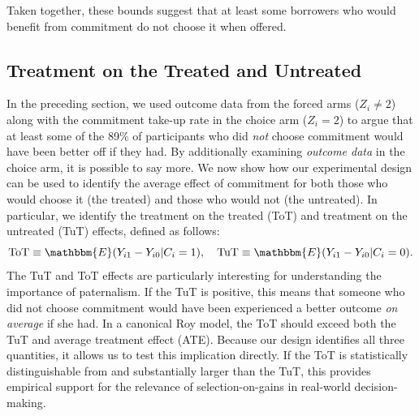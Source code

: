 \documentclass[oneside,11pt]{article}
\begin{document}

Taken together, these bounds suggest that at least some borrowers who would benefit from commitment do not choose it when offered. 

\subsection{Treatment on the Treated and Untreated}
In the preceding section, we used outcome data from the forced arms ($Z_i\neq 2$) along with the commitment take-up rate in the choice arm ($Z_i = 2$) to argue that at least some of the 89\% of participants who did \emph{not} choose commitment would have been better off if they had. By additionally examining \emph{outcome data} in the choice arm, it is possible to say more. We now show how our experimental design can be used to identify the average effect of commitment for both those who would choose it (the treated) and those who would not (the untreated). In particular, we identify the treatment on the treated (ToT) and treatment on the untreated (TuT) effects, defined as follows:
\[
\text{ToT} \equiv \mathbbm{E}(Y_{i1} - Y_{i0} | C_i = 1), \quad
\text{TuT} \equiv \mathbbm{E}(Y_{i1} - Y_{i0} | C_i = 0).
\]
The TuT and ToT effects are particularly interesting for understanding the importance of paternalism. If the TuT is positive, this means that someone who did not choose commitment would have been experienced a better outcome \emph{on average} if she had. In a canonical Roy model, the ToT should exceed both the TuT and average treatment effect (ATE). Because our design identifies all three quantities, it allows us to test this implication directly. If the ToT is statistically distinguishable from and substantially larger than the TuT, this provides empirical support for the relevance of selection-on-gains in real-world decision-making.
\end{document}
